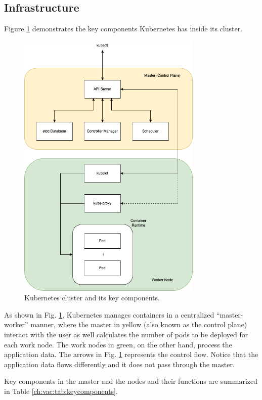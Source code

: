 \subsection{Infrastructure}

Figure \ref{ch:vac:fig:kubernetescluster} demonstrates the key components Kubernetes has inside its cluster.
\begin{figure}[!htb]
	\centering
	\includegraphics[width=250pt]{chapters/part-3/figures/k8sarchitecture.png}
	\caption{Kubernetes cluster and its key components.} \label{ch:vac:fig:kubernetescluster}
\end{figure}

As shown in Fig. \ref{ch:vac:fig:kubernetescluster}, Kubernetes manages containers in a centralized ``master-worker'' manner, where the master in yellow (also known as the control plane) interact with the user as well calculates the number of pods to be deployed for each work node. The work nodes in green, on the other hand, process the application data. The arrows in Fig. \ref{ch:vac:fig:kubernetescluster} represents the control flow. Notice that the application data flows differently and it does not pass through the master.

Key components in the master and the nodes and their functions are summarized in Table \ref{ch:vac:tab:keycomponents}.

